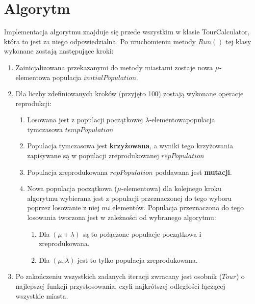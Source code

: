 \documentclass[11pt]{article}
\begin{document}
\section{Algorytm}
Implementacja algorytmu znajduje się przede wszystkim w klasie TourCalculator, która to jest za niego odpowiedzialna. Po uruchomieniu metody $Run()$ tej klasy wykonane zostają następujące kroki:
\begin{enumerate}
\item Zainicjalizowana przekazanymi do metody miastami zostaje nowa $\mu$-elementowa populacja $initialPopulation$.
\item Dla liczby zdefiniowanych kroków (przyjęto 100) zostają wykonane operacje reprodukcji:
	\begin{enumerate}
	\item Losowana jest z populacji początkowej $\lambda$-elementowapopulacja tymczasowa $tempPopulation$
	\item Populacja tymczasowa jest \textbf{krzyżowana}, a wyniki tego krzyżowania zapisywane są w populacji zreprodukowanej $repPopulation$
	\item Populacja zreprodukowana $repPopulation$ poddawana jest \textbf{mutacji}.
	\item Nowa populacja początkowa ($\mu$-elementowa) dla kolejnego kroku algorytmu wybierana jest z populacji przeznaczonej do tego wyboru poprzez losowanie z niej $mi$ elementów. Populacja przeznaczona do tego losowania tworzona jest w zależności od wybranego algorytmu:
		\begin{enumerate}
		\item Dla $(\mu + \lambda)$ są to połączone populacje początkowa i zreprodukowana.
		\item Dla $(\mu, \lambda)$ jest to tylko populacja zreprodukowana.
		\end{enumerate}
	\end{enumerate}
	\item Po zakończeniu wszystkich zadanych iteracji zwracany jest osobnik ($Tour$) o najlepszej funkcji przystosowania, czyli najkrótszej odległości łączącej wszystkie miasta.
\end{enumerate}
\end{document}
